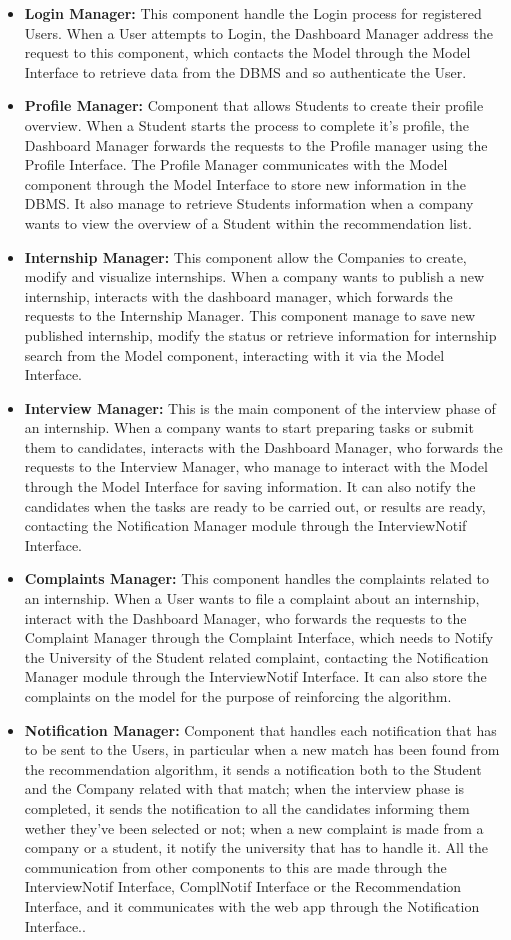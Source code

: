 \begin{itemize}
    \item \textbf{Login Manager:} This component handle the Login process for registered Users. When a User attempts to Login, the Dashboard Manager address the request to this component, which contacts the Model through the Model Interface to retrieve data from the DBMS and so authenticate the User. 
    \item \textbf{Profile Manager:} Component that allows Students to create their profile overview. When a Student starts the process to complete it's profile, the Dashboard Manager forwards the requests to the Profile manager using the Profile Interface. The Profile Manager communicates with the Model component through the Model Interface to store new information in the DBMS. It also manage to retrieve Students information when a company wants to view the overview of a Student within the recommendation list.
    \item \textbf{Internship Manager:} This component allow the Companies to create, modify and visualize internships. When a company wants to publish a new internship, interacts with the dashboard manager, which forwards the requests to the Internship Manager. This component manage to save new published internship, modify the status or retrieve information for internship search from the Model component, interacting with it via the Model Interface.
    \item \textbf{Interview Manager:} This is the main component of the interview phase of an internship. When a company wants to start preparing tasks or submit them to candidates, interacts with the Dashboard Manager, who forwards the requests to the Interview Manager, who manage to interact with the Model through the Model Interface for saving information. It can also notify the candidates when the tasks are ready to be carried out, or results are ready, contacting the Notification Manager module through the InterviewNotif Interface.
    \item \textbf{Complaints Manager:} This component handles the complaints related to an internship. When a User wants to file a complaint about an internship, interact with the Dashboard Manager, who forwards the requests to the Complaint Manager through the Complaint Interface, which needs to Notify the University of the Student related complaint, contacting the Notification Manager module through the InterviewNotif Interface. It can also store the complaints on the model for the purpose of reinforcing the algorithm.
    \item \textbf{Notification Manager:} Component that handles each notification that has to be sent to the Users, in particular when a new match has been found from the recommendation algorithm, it sends a notification both to the Student and the Company related with that match; when the interview phase is completed, it sends the notification to all the candidates informing them wether they've been selected or not; when a new complaint is made from a company or a student, it notify the university that has to handle it. All the communication from other components to this are made through the InterviewNotif Interface, ComplNotif Interface or the Recommendation Interface, and it communicates with the web app through the Notification Interface..

\end{itemize}
